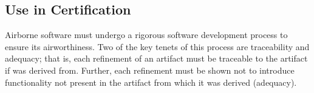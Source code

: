 %
%
%

\subsection{Use in Certification}
Airborne software must undergo a rigorous software development process to ensure its airworthiness.
Two of the key tenets of this process are traceability and adequacy; that is, each refinement of an artifact must be traceable to the artifact if was derived from. Further, each refinement must be shown not to introduce functionality not present in the artifact from which it was derived (adequacy). 
%


